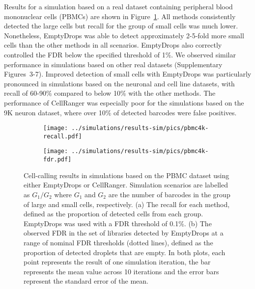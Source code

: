 \documentclass[10pt,letterpaper]{article}
\newcommand{\suppfigsimresults}{3-7}
\begin{document}
Results for a simulation based on a real dataset containing peripheral blood mononuclear cells (PBMCs) are shown in Figure~\ref{fig:simpbmc}.
All methods consistently detected the large cells but recall for the group of small cells was much lower.
Nonetheless, EmptyDrops was able to detect approximately 2-5-fold more small cells than the other methods in all scenarios.
EmptyDrops also correctly controlled the FDR below the specified threshold of 1\%.
We observed similar performance in simulations based on other real datasets (Supplementary Figures~\suppfigsimresults{}).
Improved detection of small cells with EmptyDrops was particularly pronounced in simulations based on the neuronal and cell line datasets,
with recall of 60-90\% compared to below 10\% with the other methods.
The performance of CellRanger was especially poor for the simulations based on the 9K neuron dataset, where over 10\% of detected barcodes were false positives.

\begin{figure}[btp]
    \begin{center}
        \begin{subfigure}{\textwidth}
        \texttt{[image: ../simulations/results-sim/pics/pbmc4k-recall.pdf]}
        \caption{}
        \end{subfigure}
        \begin{subfigure}{\textwidth}
        \texttt{[image: ../simulations/results-sim/pics/pbmc4k-fdr.pdf]}
        \caption{}
        \end{subfigure}
    \end{center}
\caption{Cell-calling results in simulations based on the PBMC dataset using either EmptyDrops or CellRanger.
Simulation scenarios are labelled as $G_1/G_2$ where $G_1$ and $G_2$ are the number of barcodes in the group of large and small cells, respectively.
(a) The recall for each method, defined as the proportion of detected cells from each group.
EmptyDrops was used with a FDR threshold of 0.1\%.
(b) The observed FDR in the set of libraries detected by EmptyDrops at a range of nominal FDR thresholds (dotted lines), defined as the proportion of detected droplets that are empty.
In both plots, each point represents the result of one simulation iteration, the bar represents the mean value across 10 iterations and the error bars represent the standard error of the mean.
}
\label{fig:simpbmc}
\end{figure}
\end{document}

